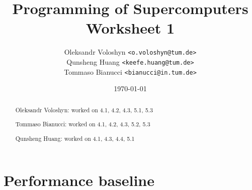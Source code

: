 \documentclass{article}
\title{Programming of Supercomputers\\Worksheet 1}
\author{
	Oleksandr Voloshyn \texttt{<o.voloshyn@tum.de>}\\ 
	Qunsheng Huang \texttt{<keefe.huang@tum.de>}\\ 
	Tommaso Bianucci \texttt{<bianucci@in.tum.de>}
	}
\date{\today}
\begin{document}
\maketitle
\renewcommand{\abstractname}{Group members's contributions}
\begin{abstract}
	\begin{center}
	Oleksandr Voloshyn: worked on 4.1, 4.2, 4.3, 5.1, 5.3

	Tommaso Bianucci: worked on 4.1, 4.2, 4.3, 5.2, 5.3
	
	Qunsheng Huang: worked on 4.1, 4.3, 4.4, 5.1
	\end{center}
\end{abstract}

\section{Performance baseline} %
\end{document}
